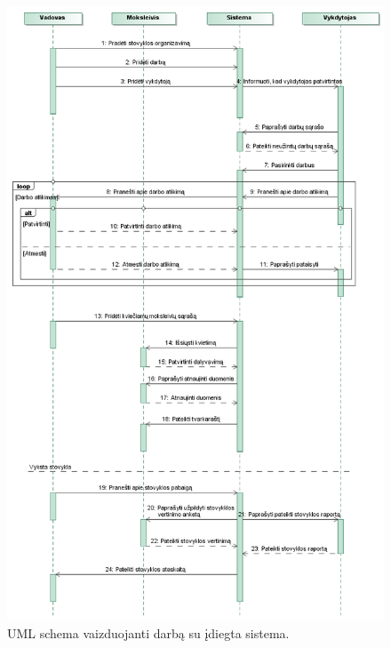 \begin{figure}[htb]
  \begin{center}
    \includegraphics[scale=0.7]{images/Seka.png}
    \caption{UML schema vaizduojanti darbą su įdiegta sistema.}
  \end{center}
  \label{fig:uml_usecase}
\end{figure}


